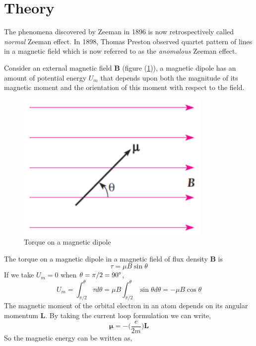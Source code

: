 \documentclass[%
 reprint,
nofootinbib,
 amsmath,amssymb,
 aps,
floatfix,
]{revtex4-2}
\begin{document}
\section{Theory}
    The phenomena discovered by Zeeman in 1896 is now retrospectively called \textit{normal} Zeeman effect. In 1898, Thomas Preston observed quartet pattern of lines in a magnetic field which is now referred to as the \textit{anomalous} Zeeman effect.
    \par
    Consider an external magnetic field $\mathbf{B}$ (figure (\ref{fig:torque})), a magnetic dipole has an amount of potential energy $U_m$ that depends upon both the magnitude of its magnetic moment and the orientation of this moment with respect to the field.
    \begin{figure}
        \centering
        \includegraphics[scale = 0.8]{Figures/torque.png}
        \caption{Torque on a magnetic dipole}
        \label{fig:torque}
    \end{figure}
    The torque on a magnetic dipole in a magnetic field of flux density $\mathbf{B}$ is
    \begin{equation}
        \tau = \mu B \sin \theta 
    \end{equation}
    If we take $U_m = 0$ when $\theta = \pi / 2 = 90 \degree$,
    \begin{equation}
        U_m = \int_{\pi/2}^{\theta} \tau d \theta = \mu B \int_{\pi/2}^{\theta} \sin \theta d \theta = - \mu B \cos \theta
    \end{equation}
    The magnetic moment of the orbital electron in an atom depends on its angular momentum $\mathbf{L}$. By taking the current loop formulation we can write,
    \begin{equation}
        \mathbf{\mu} = - \Big( \dfrac{e}{2m}\Big) \mathbf{L}
    \end{equation}
    So the magnetic energy can be written as,
\end{document}
